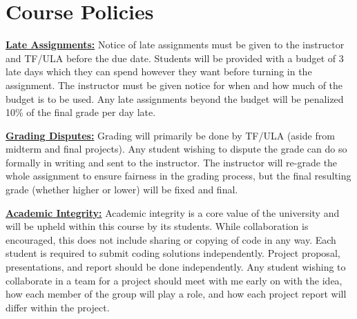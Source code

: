 \documentclass[11pt,letterpaper]{article}
\newcommand{\mysec}[1]{\medskip\noindent\underline{\textbf{#1}}}
\begin{document}
\clearpage
\section*{Course Policies}

\mysec{Late Assignments:} Notice of late assignments must be given to the instructor and TF/ULA before the due date. Students will be provided with a budget of 3 late days which they can spend however they want before turning in the assignment. The instructor must be given notice for when and how much of the budget is to be used. Any late assignments beyond the budget will be penalized 10\% of the final grade per day late. 

\mysec{Grading Disputes:} Grading will primarily be done by TF/ULA (aside from midterm and final projects). Any student wishing to dispute the grade can do so formally in writing and sent to the instructor. The instructor will re-grade the whole assignment to ensure fairness in the grading process, but the final resulting grade (whether higher or lower) will be fixed and final.  


\mysec{Academic Integrity:} Academic integrity is a core value of the university and will be upheld within this course by its students. While collaboration is encouraged, this does not include sharing or copying of code in any way. Each student is required to submit coding solutions independently. Project proposal, presentations, and report should be done independently. Any student wishing to collaborate in a team for a project should meet with me early on with the idea, how each member of the group will play a role, and how each project report will differ within the project. 
\end{document}
